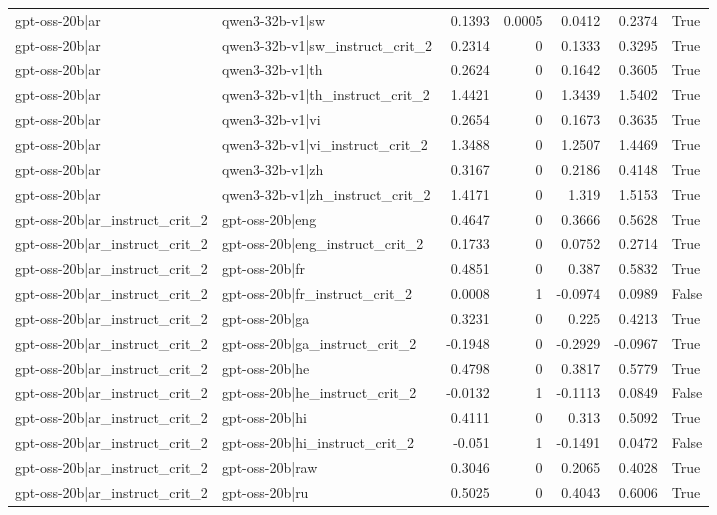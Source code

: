 \begin{table}
\begin{tabular}{l l r r r r l}
gpt-oss-20b|ar & qwen3-32b-v1|sw & 0.1393 & 0.0005 & 0.0412 & 0.2374 & True \\
gpt-oss-20b|ar & qwen3-32b-v1|sw_instruct_crit_2 & 0.2314 & 0 & 0.1333 & 0.3295 & True \\
gpt-oss-20b|ar & qwen3-32b-v1|th & 0.2624 & 0 & 0.1642 & 0.3605 & True \\
gpt-oss-20b|ar & qwen3-32b-v1|th_instruct_crit_2 & 1.4421 & 0 & 1.3439 & 1.5402 & True \\
gpt-oss-20b|ar & qwen3-32b-v1|vi & 0.2654 & 0 & 0.1673 & 0.3635 & True \\
gpt-oss-20b|ar & qwen3-32b-v1|vi_instruct_crit_2 & 1.3488 & 0 & 1.2507 & 1.4469 & True \\
gpt-oss-20b|ar & qwen3-32b-v1|zh & 0.3167 & 0 & 0.2186 & 0.4148 & True \\
gpt-oss-20b|ar & qwen3-32b-v1|zh_instruct_crit_2 & 1.4171 & 0 & 1.319 & 1.5153 & True \\
gpt-oss-20b|ar_instruct_crit_2 & gpt-oss-20b|eng & 0.4647 & 0 & 0.3666 & 0.5628 & True \\
gpt-oss-20b|ar_instruct_crit_2 & gpt-oss-20b|eng_instruct_crit_2 & 0.1733 & 0 & 0.0752 & 0.2714 & True \\
gpt-oss-20b|ar_instruct_crit_2 & gpt-oss-20b|fr & 0.4851 & 0 & 0.387 & 0.5832 & True \\
gpt-oss-20b|ar_instruct_crit_2 & gpt-oss-20b|fr_instruct_crit_2 & 0.0008 & 1 & -0.0974 & 0.0989 & False \\
gpt-oss-20b|ar_instruct_crit_2 & gpt-oss-20b|ga & 0.3231 & 0 & 0.225 & 0.4213 & True \\
gpt-oss-20b|ar_instruct_crit_2 & gpt-oss-20b|ga_instruct_crit_2 & -0.1948 & 0 & -0.2929 & -0.0967 & True \\
gpt-oss-20b|ar_instruct_crit_2 & gpt-oss-20b|he & 0.4798 & 0 & 0.3817 & 0.5779 & True \\
gpt-oss-20b|ar_instruct_crit_2 & gpt-oss-20b|he_instruct_crit_2 & -0.0132 & 1 & -0.1113 & 0.0849 & False \\
gpt-oss-20b|ar_instruct_crit_2 & gpt-oss-20b|hi & 0.4111 & 0 & 0.313 & 0.5092 & True \\
gpt-oss-20b|ar_instruct_crit_2 & gpt-oss-20b|hi_instruct_crit_2 & -0.051 & 1 & -0.1491 & 0.0472 & False \\
gpt-oss-20b|ar_instruct_crit_2 & gpt-oss-20b|raw & 0.3046 & 0 & 0.2065 & 0.4028 & True \\
gpt-oss-20b|ar_instruct_crit_2 & gpt-oss-20b|ru & 0.5025 & 0 & 0.4043 & 0.6006 & True \\

\end{tabular}
\end{table}
